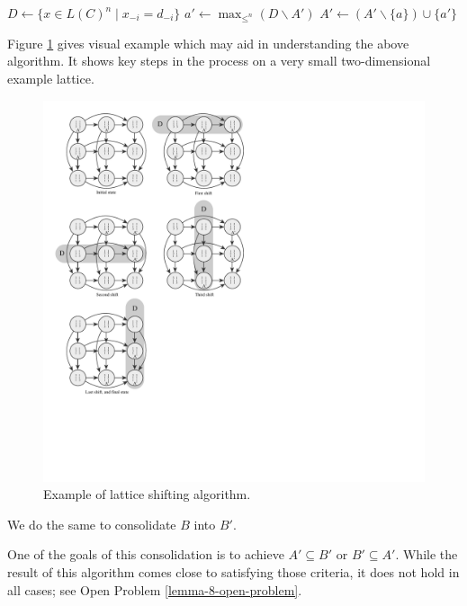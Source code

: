 	\begin{algorithm}
		\begin{algorithmic}
					\State $D \gets \{x \in L(C)^n \mid x_{-i} = d_{-i}\}$
						\State $a' \gets \max_{\le^n}(D \backslash A')$
						\State $A' \gets (A' \backslash \{a\}) \cup \{a'\}$ 
					\EndFor
				\EndFor
			\EndFor
		\end{algorithmic}
	\end{algorithm}

	Figure \ref{figure-algorithm-example} gives visual example which may aid in understanding the above algorithm. It shows key steps in the process on a very small two-dimensional example lattice.

	\begin{figure}[ht]
		\begin{center}
			\includegraphics[width=4.6in]{../figures/diagram8.pdf}
			\caption{Example of lattice shifting algorithm.}
			\label{figure-algorithm-example}
		\end{center}
	\end{figure}

	We do the same to consolidate $B$ into $B'$.

	One of the goals of this consolidation is to achieve $A' \subseteq B'$ or $B' \subseteq A'$. While the result of this algorithm comes close to satisfying those criteria, it does not hold in all cases; see Open Problem \ref{lemma-8-open-problem}.

